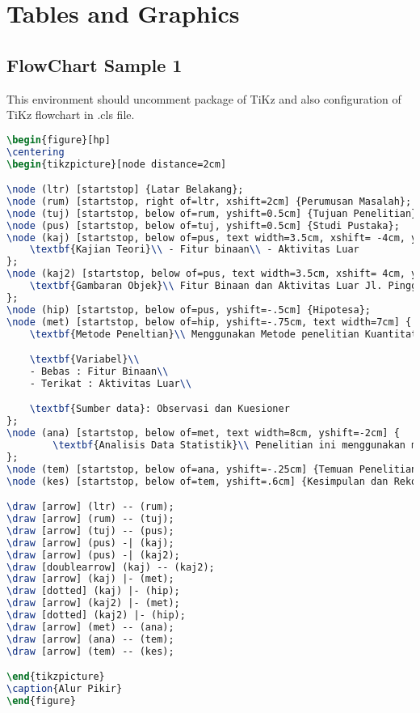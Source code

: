 \documentclass{article}
\begin{document}
\section{Tables and Graphics}
\subsection{FlowChart Sample 1}
This environment should uncomment package of TiKz and also configuration of TiKz flowchart in .cls file.
\begin{lstlisting}[language=TeX, caption=Flowchart sample 1]
\begin{figure}[hp]
\centering
\begin{tikzpicture}[node distance=2cm]

\node (ltr) [startstop] {Latar Belakang};
\node (rum) [startstop, right of=ltr, xshift=2cm] {Perumusan Masalah};
\node (tuj) [startstop, below of=rum, yshift=0.5cm] {Tujuan Penelitian};
\node (pus) [startstop, below of=tuj, yshift=0.5cm] {Studi Pustaka};
\node (kaj) [startstop, below of=pus, text width=3.5cm, xshift= -4cm, yshift=.5cm] {
	\textbf{Kajian Teori}\\ - Fitur binaan\\ - Aktivitas Luar
};
\node (kaj2) [startstop, below of=pus, text width=3.5cm, xshift= 4cm, yshift=.5cm] {
	\textbf{Gambaran Objek}\\ Fitur Binaan dan Aktivitas Luar Jl. Pinggir Laut
};
\node (hip) [startstop, below of=pus, yshift=-.5cm] {Hipotesa};
\node (met) [startstop, below of=hip, yshift=-.75cm, text width=7cm] {
	\textbf{Metode Peneltian}\\ Menggunakan Metode penelitian Kuantitatif Rasionalistik

	\textbf{Variabel}\\
	- Bebas : Fitur Binaan\\
	- Terikat : Aktivitas Luar\\

	\textbf{Sumber data}: Observasi dan Kuesioner
};
\node (ana) [startstop, below of=met, text width=8cm, yshift=-2cm] {
		\textbf{Analisis Data Statistik}\\ Penelitian ini menggunakan metode statika berupa uji regresi guna mengetahui pengaruh variabel fitur binaan terhadap variabel aktivitas luar.
};
\node (tem) [startstop, below of=ana, yshift=-.25cm] {Temuan Penelitian};
\node (kes) [startstop, below of=tem, yshift=.6cm] {Kesimpulan dan Rekomendasi};

\draw [arrow] (ltr) -- (rum);
\draw [arrow] (rum) -- (tuj);
\draw [arrow] (tuj) -- (pus);
\draw [arrow] (pus) -| (kaj);
\draw [arrow] (pus) -| (kaj2);
\draw [doublearrow] (kaj) -- (kaj2);
\draw [arrow] (kaj) |- (met);
\draw [dotted] (kaj) |- (hip);
\draw [arrow] (kaj2) |- (met);
\draw [dotted] (kaj2) |- (hip);
\draw [arrow] (met) -- (ana);
\draw [arrow] (ana) -- (tem);
\draw [arrow] (tem) -- (kes);

\end{tikzpicture}
\caption{Alur Pikir}
\end{figure}
\end{lstlisting}
\end{document}
